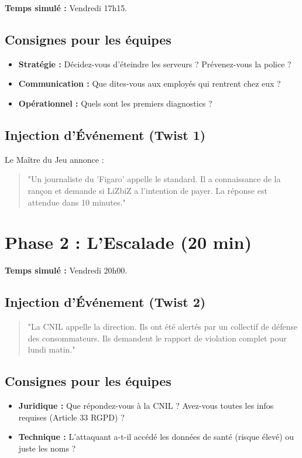 \textbf{Temps simulé :} Vendredi 17h15.

\subsection{Consignes pour les équipes}
\begin{itemize}
    \item \textbf{Stratégie :} Décidez-vous d'éteindre les serveurs ? Prévenez-vous la police ?
    \item \textbf{Communication :} Que dites-vous aux employés qui rentrent chez eux ?
    \item \textbf{Opérationnel :} Quels sont les premiers diagnostics ?
\end{itemize}

\subsection{Injection d'Événement (Twist 1)}
Le Maître du Jeu annonce :
\begin{quote}
"Un journaliste du 'Figaro' appelle le standard. Il a connaissance de la rançon et demande si LiZbiZ a l'intention de payer. La réponse est attendue dans 10 minutes."
\end{quote}

\section{Phase 2 : L'Escalade (20 min)}

\textbf{Temps simulé :} Vendredi 20h00.

\subsection{Injection d'Événement (Twist 2)}
\begin{quote}
"La CNIL appelle la direction. Ils ont été alertés par un collectif de défense des consommateurs. Ils demandent le rapport de violation complet pour lundi matin."
\end{quote}

\subsection{Consignes pour les équipes}
\begin{itemize}
    \item \textbf{Juridique :} Que répondez-vous à la CNIL ? Avez-vous toutes les infos requises (Article 33 RGPD) ?
    \item \textbf{Technique :} L'attaquant a-t-il accédé les données de santé (risque élevé) ou juste les noms ?
\end{itemize}

